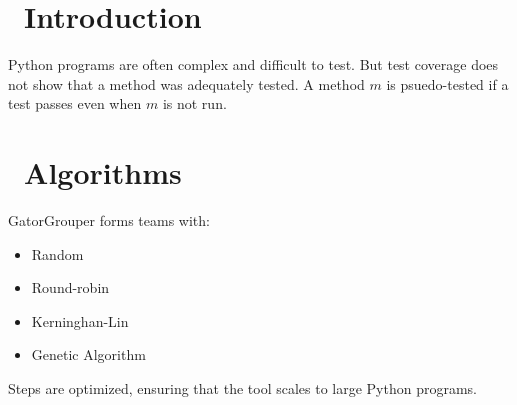 \documentclass[a0paper,fleqn]{betterposter}
\begin{document}
{  \vspace*{-.5in}

  \section{\faSend~Introduction}
  Python programs are often complex and difficult to test.
  But test coverage does not show that a method was adequately tested.
  A method $m$ is psuedo-tested if a test passes even when $m$ is not run.



  \vspace*{-.25in}
  \section{\faCog~Algorithms}
  GatorGrouper forms teams with:

  \begin{itemize}
    \item Random
    \item Round-robin
    \item Kerninghan-Lin
    \item Genetic Algorithm
  \end{itemize}


  \vspace*{.25in}
  Steps are optimized, ensuring that the tool scales to large Python programs.
  \vspace*{.5in}

  \vfill

}
\end{document}
